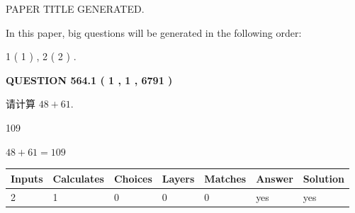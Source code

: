 \documentclass{ctexart}
\begin{document}
   
\vspace{0.2in}
   
   
   
   
   
   
   
   
 \vspace{0.2in}
 
 
 
 
   
   
 PAPER TITLE GENERATED.
   
   
   
\vspace{0.2in}
   
In this paper, big questions will be generated in the following order: 
   
   
   1 ( 1 )
 ,
   2 ( 2 )
 .
  
\vspace{0.2in}
  
{\textbf{\Large{QUESTION
564.1 
 ( 1 , 1 , 6791 )
}}}
  
  
 
请计算 $ %
48 +  %
61 $.
 
 
 
\noindent{}
 
 

109
 
 
\noindent{}
 
 

 
 
 
\noindent{}
 
 

$ %
48 +  %
61=   %
109$
 
 
\noindent{}
 
 

 
   
   
   
   
\noindent\begin{tabular}{|l|l|l|l|l|l|l|}
 \hline
Inputs & Calculates & Choices & Layers & Matches & Answer & Solution \\ \hline
 2  & 
 1  & 
 0
  & 
 0  & 
 0  & 
  yes & 
  yes 
  \\ \hline
 \end{tabular}
   
\end{document}
